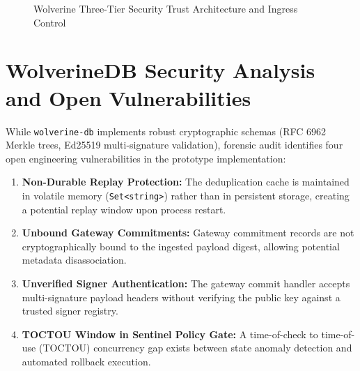 \begin{figure}[htbp]
\caption{Wolverine Three-Tier Security Trust Architecture and Ingress Control}
\label{fig:trust-tiers}
\end{figure}

\section{WolverineDB Security Analysis and Open Vulnerabilities}
\label{sec:sec-wolverinedb}
While \texttt{wolverine-db} implements robust cryptographic schemas (RFC 6962 Merkle trees, Ed25519 multi-signature validation), forensic audit identifies four open engineering vulnerabilities in the prototype implementation:

\begin{enumerate}
    \item \textbf{Non-Durable Replay Protection:} The deduplication cache is maintained in volatile memory (\texttt{Set<string>}) rather than in persistent storage, creating a potential replay window upon process restart.
    \item \textbf{Unbound Gateway Commitments:} Gateway commitment records are not cryptographically bound to the ingested payload digest, allowing potential metadata disassociation.
    \item \textbf{Unverified Signer Authentication:} The gateway commit handler accepts multi-signature payload headers without verifying the public key against a trusted signer registry.
    \item \textbf{TOCTOU Window in Sentinel Policy Gate:} A time-of-check to time-of-use (TOCTOU) concurrency gap exists between state anomaly detection and automated rollback execution.
\end{enumerate}

